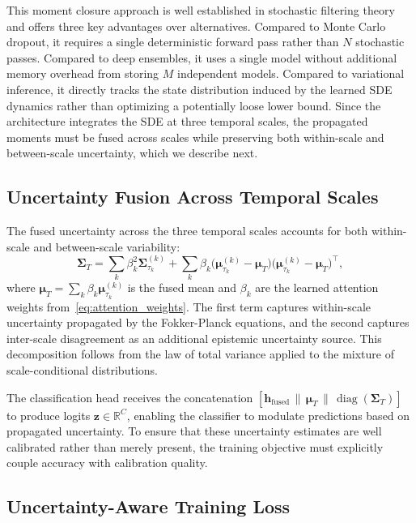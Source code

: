 \documentclass[journal]{IEEEtran}
\newcommand{\R}{\mathbb{R}}
\DeclareMathOperator{\diag}{diag}
\begin{document}
This moment closure approach is well established in stochastic filtering theory~\cite{sarkka2013bayesian} and offers three key advantages over alternatives. Compared to Monte Carlo dropout, it requires a single deterministic forward pass rather than $N$ stochastic passes. Compared to deep ensembles, it uses a single model without additional memory overhead from storing $M$ independent models. Compared to variational inference, it directly tracks the state distribution induced by the learned SDE dynamics rather than optimizing a potentially loose lower bound. Since the architecture integrates the SDE at three temporal scales, the propagated moments must be fused across scales while preserving both within-scale and between-scale uncertainty, which we describe next.


\subsection{Uncertainty Fusion Across Temporal Scales}

The fused uncertainty across the three temporal scales accounts for both within-scale and between-scale variability:
\begin{equation}
\boldsymbol{\Sigma}_T = \sum_k \beta_k^2 \boldsymbol{\Sigma}_{\tau_k}^{(k)} + \sum_k \beta_k \big(\boldsymbol{\mu}_{\tau_k}^{(k)} - \boldsymbol{\mu}_T\big)\big(\boldsymbol{\mu}_{\tau_k}^{(k)} - \boldsymbol{\mu}_T\big)^\top,
\label{eq:fused_cov}
\end{equation}
where $\boldsymbol{\mu}_T = \sum_k \beta_k \boldsymbol{\mu}_{\tau_k}^{(k)}$ is the fused mean and $\beta_k$ are the learned attention weights from~\eqref{eq:attention_weights}. The first term captures within-scale uncertainty propagated by the Fokker-Planck equations, and the second captures inter-scale disagreement as an additional epistemic uncertainty source. This decomposition follows from the law of total variance applied to the mixture of scale-conditional distributions.

The classification head receives the concatenation $[\mathbf{h}_{\mathrm{fused}} \,\|\, \boldsymbol{\mu}_T \,\|\, \diag(\boldsymbol{\Sigma}_T)]$ to produce logits $\mathbf{z} \in \R^C$, enabling the classifier to modulate predictions based on propagated uncertainty. To ensure that these uncertainty estimates are well calibrated rather than merely present, the training objective must explicitly couple accuracy with calibration quality.


\subsection{Uncertainty-Aware Training Loss}
\end{document}
